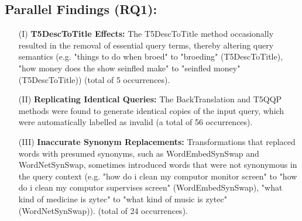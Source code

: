 \subsection{Parallel Findings (RQ1):}
\begin{itemize}
    \item[(I)] \textbf{T5DescToTitle Effects:} The T5DescToTitle method occasionally resulted in the removal of essential query terms, thereby altering query semantics (e.g. "things to do when broed" to "broeding" (T5DescToTitle), "how money does the show seinfled make" to "seinfled money" (T5DescToTitle)) (total of 5 occurrences).
    \item[(II)] \textbf{Replicating Identical Queries:} The BackTranslation and T5QQP methods were found to generate identical copies of the input query, which were automatically labelled as invalid (a total of 56 occurrences).
    \item[(III)] \textbf{Inaccurate Synonym Replacements:} Transformations that replaced words with presumed synonyms, such as WordEmbedSynSwap and WordNetSynSwap, sometimes introduced words that were not synonymous in the query context (e.g. "how do i clean my computor monitor screen" to "how do i clean my computor supervises screen" (WordEmbedSynSwap), "what kind of medicine is zytec" to "what kind of music is zytec" (WordNetSynSwap)). (total of 24 occurrences).
\end{itemize}
